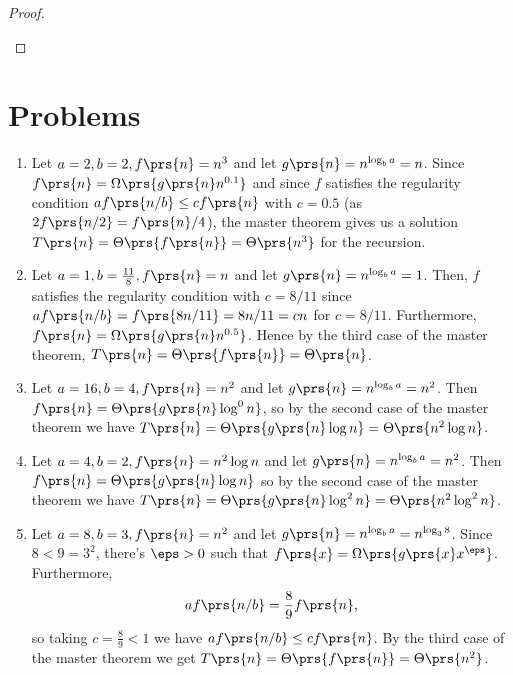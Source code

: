 \documentclass[oneside]{scrbook}
\theoremstyle{definition}
\begin{document}
\begin{exercise}
\begin{proof}
\begin{enumerate}

\end{enumerate}
\end{proof}
\end{exercise}

\section{Problems}

\begin{problem}
\begin{enumerate}[label=\alph*.]
\item %
Let $a = 2, b = 2, f\prs{n} = n^3$ and let $g\prs{n} = n^{\log_b a} = n$. Since $f\prs{n} = \Omega\prs{g\prs{n} n^{0.1}}$ and since $f$ satisfies the regularity condition $a f\prs{n/b} \leq c f\prs{n}$ with $c = 0.5$ (as $2 f\prs{n/2} = f\prs{n}/4$), the master theorem gives us a solution $T\prs{n} = \Theta\prs{f\prs{n}} = \Theta\prs{n^3}$ for the recursion.

\item %
Let $a = 1, b = \frac{11}{8}, f\prs{n} = n$ and let $g\prs{n} = n^{\log_b a} = 1$. Then, $f$ satisfies the regularity condition with $c = 8/11$ since $a f\prs{n/b} = f\prs{8 n / 11} = 8 n / 11 = c n$ for $c = 8/11$. Furthermore, $f\prs{n} = \Omega\prs{g\prs{n} n^{0.5}}$. Hence by the third case of the master theorem, $T\prs{n} = \Theta\prs{f\prs{n}} = \Theta\prs{n}$.

\item %
Let $a=16, b = 4, f\prs{n} = n^2$ and let $g\prs{n} = n^{\log_b a} = n^2$. Then $f\prs{n} = \Theta\prs{g\prs{n} \log^0 n}$, so by the second case of the master theorem we have $T\prs{n} = \Theta\prs{g\prs{n} \log n} = \Theta\prs{n^2 \log n}$.

\item %
Let $a = 4, b = 2, f\prs{n} = n^2 \log n$ and let $g\prs{n} = n^{\log_b a} = n^2$. Then $f\prs{n} = \Theta\prs{g\prs{n} \log n}$ so by the second case of the master theorem we have $T\prs{n} = \Theta\prs{g\prs{n} \log^2 n} = \Theta\prs{n^2 \log^2 n}$.

\item %
Let $a = 8, b = 3, f\prs{n} = n^2$ and let $g\prs{n} = n^{\log_b a} = n^{\log_3 8}$. Since $8 < 9 = 3^2$, there's $\eps > 0$ such that $f\prs{x} = \Omega\prs{g\prs{x} x^{\eps}}$. Furthermore,
\begin{align*}
a f\prs{n/b} = \frac{8}{9} f\prs{n} \text{,}
\end{align*}
so taking $c = \frac{8}{9} < 1$ we have $a f\prs{n/b} \leq c f\prs{n}$.
By the third case of the master theorem we get $T\prs{n} = \Theta\prs{f\prs{n}} = \Theta\prs{n^2}$.


\end{enumerate}
\end{problem}
\end{document}
